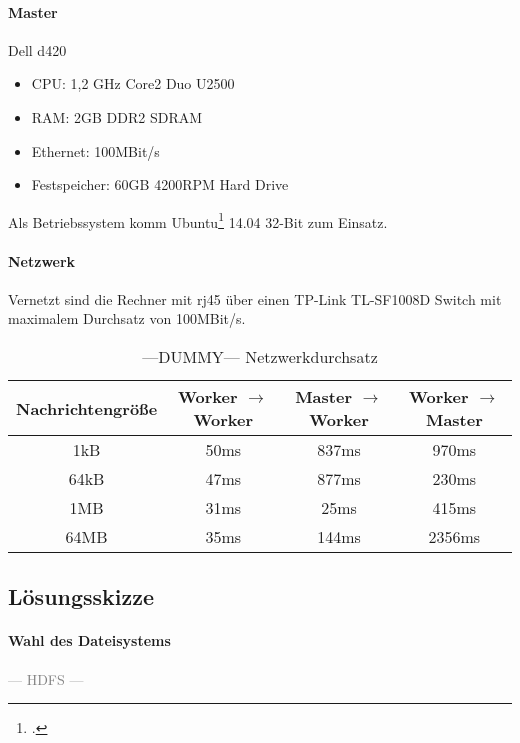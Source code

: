 \paragraph{Master}
Dell d420
\begin{itemize}
	\item CPU: 1,2 GHz Core2 Duo U2500
	\item RAM: 2GB DDR2 SDRAM
	\item Ethernet: 100MBit/s
	\item Festspeicher: 60GB 4200RPM Hard Drive
\end{itemize}
Als Betriebssystem komm Ubuntu\footcite{ubuntu} 14.04 32-Bit zum Einsatz.

\paragraph{Netzwerk}
Vernetzt sind die Rechner mit \gls{rj45} über einen TP-Link TL-SF1008D Switch mit maximalem Durchsatz von 100MBit/s.


\begin{table}[ht]
\caption{---DUMMY--- Netzwerkdurchsatz} %
\centering %
\begin{tabular}{c c c c} %
\hline\hline %
Nachrichtengröße & Worker $\rightarrow$ Worker & Master $\rightarrow$ Worker & Worker $\rightarrow$ Master \\ [0.5ex] %
\hline %
1kB & 50ms & 837ms & 970ms \\ %
64kB & 47ms & 877ms & 230ms \\
1MB & 31ms & 25ms & 415ms \\
64MB & 35ms & 144ms & 2356ms \\ [1ex] 
\hline %
\end{tabular}
\label{table:nonlin} %
\end{table}

\subsection{Lösungsskizze}


\paragraph{Wahl des Dateisystems}

\textcolor{gray}{--- HDFS ---}\\

